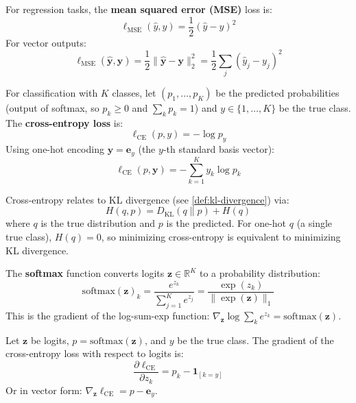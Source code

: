 \begin{definition}
    For regression tasks, the \textbf{mean squared error (MSE)} loss is:
    \[
        \ell_{\text{MSE}}(\hat{y}, y) = \frac{1}{2}(\hat{y} - y)^2
    \]
    For vector outputs:
    \[
        \ell_{\text{MSE}}(\hat{\mathbf{y}}, \mathbf{y}) = \frac{1}{2}\|\hat{\mathbf{y}} - \mathbf{y}\|_2^2 = \frac{1}{2}\sum_{j} (\hat{y}_j - y_j)^2
    \]
\end{definition}

\begin{definition}
    For classification with $K$ classes, let $(p_1, \ldots, p_K)$ be the predicted probabilities (output of softmax, so $p_k \geq 0$ and $\sum_k p_k = 1$) and $y \in \{1, \ldots, K\}$ be the true class. The \textbf{cross-entropy loss} is:
    \[
        \ell_{\text{CE}}(p, y) = -\log p_y
    \]
    Using one-hot encoding $\mathbf{y} = \mathbf{e}_y$ (the $y$-th standard basis vector):
    \[
        \ell_{\text{CE}}(p, \mathbf{y}) = -\sum_{k=1}^{K} y_k \log p_k
    \]
\end{definition}

\begin{remark}
    Cross-entropy relates to KL divergence (see \cref{def:kl-divergence}) via:
    \[
        H(q, p) = D_{\mathrm{KL}}(q \| p) + H(q)
    \]
    where $q$ is the true distribution and $p$ is the predicted. For one-hot $q$ (a single true class), $H(q) = 0$, so minimizing cross-entropy is equivalent to minimizing KL divergence.
\end{remark}

\begin{definition}[Softmax]
    The \textbf{softmax} function converts logits $\mathbf{z} \in \mathbb{R}^K$ to a probability distribution:
    \[
        \text{softmax}(\mathbf{z})_k = \frac{e^{z_k}}{\sum_{j=1}^{K} e^{z_j}} = \frac{\exp(z_k)}{\|\exp(\mathbf{z})\|_1}
    \]
    This is the gradient of the log-sum-exp function: $\nabla_\mathbf{z} \log\sum_k e^{z_k} = \text{softmax}(\mathbf{z})$.
\end{definition}

\begin{proposition}
    Let $\mathbf{z}$ be logits, $p = \text{softmax}(\mathbf{z})$, and $y$ be the true class. The gradient of the cross-entropy loss with respect to logits is:
    \[
        \frac{\partial \ell_{\text{CE}}}{\partial z_k} = p_k - \mathbf{1}_{[k=y]}
    \]
    Or in vector form: $\nabla_\mathbf{z} \ell_{\text{CE}} = p - \mathbf{e}_y$.
\end{proposition}

